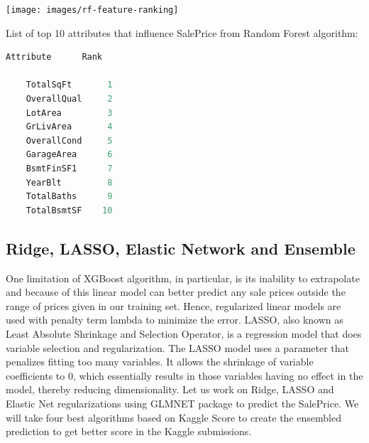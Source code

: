 \documentclass[sigconf]{acmart}
\begin{document}
	\begin{center}		
		\texttt{[image: images/rf-feature-ranking]}	
	\end{center}
	
	List of top 10 attributes that influence SalePrice from Random Forest algorithm:
	
	\begin{lstlisting}[language=R]
	Attribute      Rank
	
	TotalSqFt       1
	OverallQual     2
	LotArea         3
	GrLivArea       4
	OverallCond    	5
	GarageArea      6	
	BsmtFinSF1	    7
	YearBlt         8
	TotalBaths      9
	TotalBsmtSF    10
	\end{lstlisting}
	
	\subsection{Ridge, LASSO, Elastic Network and Ensemble}
	
	One limitation of XGBoost algorithm, in particular, is its inability to extrapolate and because of this linear model can better predict any sale prices outside the range of prices given in our training set. Hence, regularized linear models are used with penalty term lambda to minimize the error. LASSO, also known as Least Absolute Shrinkage and Selection Operator, is a regression model that does variable selection and regularization. The LASSO model uses a parameter that penalizes fitting too many variables. It allows the shrinkage of variable coefficients to 0, which essentially results in those variables having no effect in the model, thereby reducing dimensionality. Let us work on Ridge, LASSO and Elastic Net regularizations using GLMNET package to predict the SalePrice. We will take four best algorithms based on Kaggle Score to create the ensembled prediction to get better score in the Kaggle submissions. 
	
\end{document}
